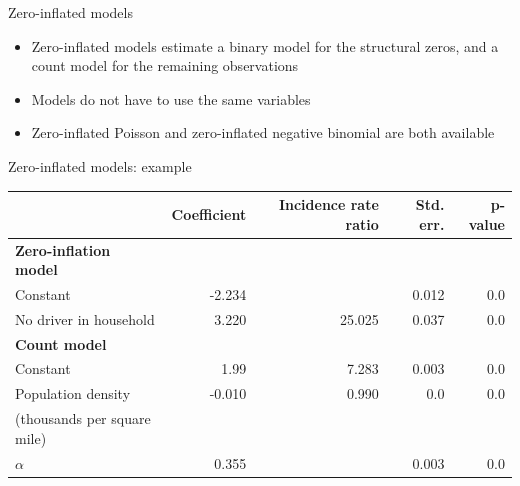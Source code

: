 \begin{frame}{Zero-inflated models}
  \begin{itemize}
    \item Zero-inflated models estimate a binary model for the structural zeros, and a count model for the remaining observations
    \item Models do not have to use the same variables
    \item Zero-inflated Poisson and zero-inflated negative binomial are both available
  \end{itemize}
\end{frame}

\begin{frame}{Zero-inflated models: example}
  \centering\begin{tabular}{lrrrr}
\toprule
{} &  Coefficient &  Incidence rate ratio &  Std. err. &        p-value \\
\midrule
\textbf{Zero-inflation model} \\
Constant    &    -2.234 &   &   0.012&   0.0 \\
No driver in household &     3.220 &             25.025 &   0.037 &   0.0 \\
\midrule
\textbf{Count model} \\
Constant            &     1.99 &              7.283 &   0.003 &   0.0 \\
Population density         &    -0.010 &              0.990 &   0.0 &  0.0 \\
(thousands per square mile) &&&& \\
$\alpha$            &     0.355 &              &   0.003 &   0.0 \\
\bottomrule
\end{tabular}\\
\tiny\citenhts
\end{frame}

